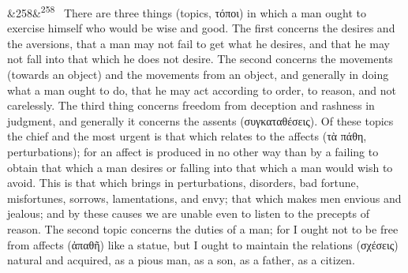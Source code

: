 \documentclass[12pt]{article}
\newcommand{\para}[1][]{\par\noindent\ifx&#1&\else\textsuperscript{\footnotesize #1}~\fi}
\begin{document}
\para[258] There are three things (topics, τόποι) in which a man ought to exercise himself who would be wise and good. The first concerns the desires and the aversions, that a man may not fail to get what he desires, and that he may not fall into that which he does not desire. The second concerns the movements (towards an object) and the movements from an object, and generally in doing what a man ought to do, that he may act according to order, to reason, and not carelessly. The third thing concerns freedom from deception and rashness in judgment, and generally it concerns the assents (συγκαταθέσεις). Of these topics the chief and the most urgent is that which relates to the affects (τὰ πάθη, perturbations); for an affect is produced in no other way than by a failing to obtain that which a man desires or falling into that which a man would wish to avoid. This is that which brings in perturbations, disorders, bad fortune, misfortunes, sorrows, lamentations, and envy; that which makes men envious and jealous; and by these causes we are unable even to listen to the precepts of reason. The second topic concerns the duties of a man; for I ought not to be free from affects (ἀπαθῆ) like a statue, but I ought to maintain the relations (σχέσεις) natural and acquired, as a pious man, as a son, as a father, as a citizen.
\end{document}
